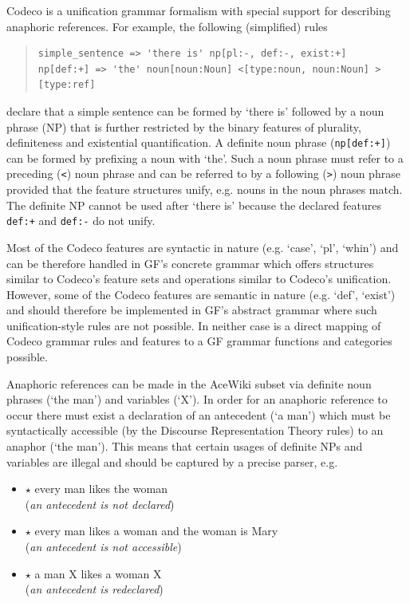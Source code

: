 \documentclass[a4paper]{article}
\begin{document}
Codeco is a unification grammar formalism with special support for describing
anaphoric references. For example, the following (simplified) rules

\small
\begin{quote}
\begin{verbatim}
simple_sentence => 'there is' np[pl:-, def:-, exist:+]
np[def:+] => 'the' noun[noun:Noun] <[type:noun, noun:Noun] >[type:ref]
\end{verbatim}
\end{quote}
\normalsize

declare that a simple
sentence can be formed by `there is' followed by
a noun phrase (NP) that is further restricted by the binary features of
plurality, definiteness and existential quantification.
A definite noun phrase (\verb!np[def:+]!) can be formed by prefixing
a noun with `the'. Such a noun phrase
must refer to a preceding (\verb!<!) noun phrase and can be referred to by a
following (\verb!>!) noun phrase provided that the feature structures
unify, e.g. nouns in the noun phrases match.
The definite NP cannot be used after `there is' because the
declared features \verb!def:+! and \verb!def:-! do not unify.

Most of the Codeco features are syntactic in nature (e.g. `case', `pl', `whin')
and can be therefore handled in
GF's concrete grammar which offers structures similar to Codeco's feature
sets and operations similar to Codeco's unification. However, some of the
Codeco features are semantic in nature (e.g. `def', `exist')
and should therefore be
implemented in GF's abstract grammar where such unification-style rules are
not possible. In neither case is a direct mapping of Codeco grammar rules
and features to a GF grammar functions and categories possible.

Anaphoric references can be made in the AceWiki subset via definite noun
phrases (`the man') and variables (`X'). In order for an anaphoric reference
to occur there must exist a declaration of an antecedent (`a man') which must
be syntactically accessible (by the Discourse Representation Theory rules)
to an anaphor (`the man'). This means that certain usages of definite NPs
and variables are illegal and should be captured by a precise parser, e.g.

\begin{itemize}
\item $\star$ every man likes the woman \hfill \\
(\emph{an antecedent is not declared})
\item $\star$ every man likes a woman and the woman is Mary \hfill \\
(\emph{an antecedent is not accessible})
\item $\star$ a man X likes a woman X \hfill \\
(\emph{an antecedent is redeclared})
\end{itemize}
\end{document}
